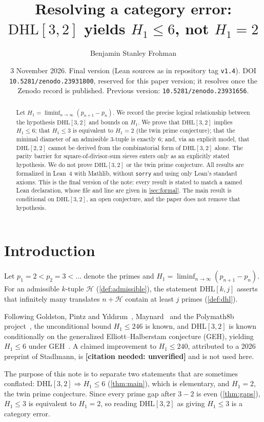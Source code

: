\documentclass[11pt]{amsart}
\title[DHL\texorpdfstring{$[3,2]$}{[3,2]} yields \texorpdfstring{$H_1\le 6$}{H1<=6}, not \texorpdfstring{$H_1=2$}{H1=2}]{Resolving a category error: \texorpdfstring{$\mathrm{DHL}[3,2]$}{DHL[3,2]} yields \texorpdfstring{$H_1 \le 6$}{H1 <= 6}, not \texorpdfstring{$H_1=2$}{H1 = 2}}
\author{Benjamin Stanley Frohman}
\date{3 November 2026. Final version (Lean sources as in repository tag \texttt{v1.4}). DOI \texttt{10.5281/zenodo.23931800}, reserved for this paper version; it resolves once the Zenodo record is published. Previous version: \texttt{10.5281/zenodo.23931656}.}
\theoremstyle{plain}
\theoremstyle{definition}
\theoremstyle{remark}
\newcommand{\DHL}{\mathrm{DHL}}
\begin{document}
\begin{abstract}
Let $H_1=\liminf_{n\to\infty}(p_{n+1}-p_n)$. We record the precise logical relationship between the hypothesis $\DHL[3,2]$ and bounds on $H_1$. We prove that $\DHL[3,2]$ implies $H_1\le 6$; that $H_1\le 3$ is equivalent to $H_1=2$ (the twin prime conjecture); that the minimal diameter of an admissible $3$-tuple is exactly $6$; and, via an explicit model, that $\DHL[2,2]$ cannot be derived from the combinatorial form of $\DHL[3,2]$ alone. The parity barrier for square-of-divisor-sum sieves enters only as an explicitly stated hypothesis. We do not prove $\DHL[3,2]$ or the twin prime conjecture. All results are formalized in Lean~4 with Mathlib, without \texttt{sorry} and using only Lean's standard axioms. This is the final version of the note: every result is stated to match a named Lean declaration, whose file and line are given in \cref{sec:formal}. The main result is conditional on $\DHL[3,2]$, an open conjecture, and the paper does not remove that hypothesis.
\end{abstract}
\maketitle
{}\par


\section{Introduction}\label{sec:intro}

Let $p_1=2<p_2=3<\dots$ denote the primes and $H_1=\liminf_{n\to\infty}(p_{n+1}-p_n)$. For an admissible $k$-tuple $\mathcal H$ (\cref{def:admissible}), the statement $\DHL[k,j]$ asserts that infinitely many translates $n+\mathcal H$ contain at least $j$ primes (\cref{def:dhl}).

Following Goldston, Pintz and Y{\i}ld{\i}r{\i}m~\cite{GPY}, Maynard~\cite{Maynard15} and the Polymath8b project~\cite{Polymath}, the unconditional bound $H_1\le 246$ is known, and $\DHL[3,2]$ is known conditionally on the generalized Elliott--Halberstam conjecture (GEH), yielding $H_1\le 6$ under GEH~\cite{Polymath}. A claimed improvement to $H_1\le 240$, attributed to a 2026 preprint of Stadlmann, is \textbf{[citation needed: unverified]} and is not used here.

The purpose of this note is to separate two statements that are sometimes conflated: $\DHL[3,2]\Rightarrow H_1\le 6$ (\cref{thm:main}), which is elementary, and $H_1=2$, the twin prime conjecture. Since every prime gap after $3-2$ is even (\cref{thm:gaps}), $H_1\le 3$ is equivalent to $H_1=2$, so reading $\DHL[3,2]$ as giving $H_1\le 3$ is a category error.
\end{document}
